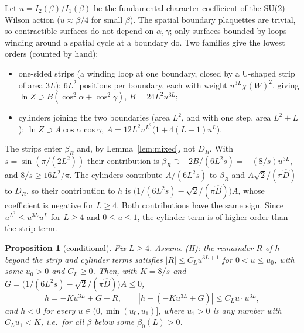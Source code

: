 \documentclass[11pt,a4paper]{article}
\newtheorem{proposition}[theorem]{Proposition}
\theoremstyle{definition}
\theoremstyle{remark}
\newcommand{\bR}{\beta_R}
\newcommand{\DR}{D_R}
\begin{document}
Let $u=I_2(\beta)/I_1(\beta)$ be the fundamental character coefficient of the SU(2) Wilson action ($u\approx\beta/4$ for small $\beta$). The spatial boundary plaquettes are trivial, so contractible surfaces do not depend on $\alpha,\gamma$; only surfaces bounded by loops winding around a spatial cycle at a boundary do. Two families give the lowest orders (counted by hand):
\begin{itemize}[leftmargin=2em]
\item one-sided strips (a winding loop at one boundary, closed by a U-shaped strip of area $3L$): $6L^2$ positions per boundary, each with weight $u^{3L}\chi(W)^2$, giving $\ln Z\supset B(\cos^2\alpha+\cos^2\gamma)$, $B=24L^2u^{3L}$;
\item cylinders joining the two boundaries (area $L^2$, and with one step, area $L^2+L$): $\ln Z\supset A\cos\alpha\cos\gamma$, $A=12L^2u^{L^2}\bigl(1+4(L-1)u^L\bigr)$.
\end{itemize}
The strips enter $\bR$ and, by Lemma~\ref{lem:mixed}, not $\DR$. With $s=\sin(\pi/(2L^2))$ their contribution is $\bR\supset-2B/(6L^2s)=-(8/s)u^{3L}$, and $8/s\ge16L^2/\pi$. The cylinders contribute $A/(6L^2s)$ to $\bR$ and $A\sqrt2/(\pi\hat D)$ to $\DR$, so their contribution to $h$ is $\bigl(1/(6L^2s)-\sqrt2/(\pi\hat D)\bigr)A$, whose coefficient is negative for $L\ge4$. Both contributions have the same sign. Since $u^{L^2}\le u^{3L}u^L$ for $L\ge4$ and $0\le u\le1$, the cylinder term is of higher order than the strip term.

\begin{proposition}[conditional]\label{prop:strong}
Fix $L\ge4$. Assume (H): the remainder $R$ of $h$ beyond the strip and cylinder terms satisfies $|R|\le C_Lu^{3L+1}$ for $0<u\le u_0$, with some $u_0>0$ and $C_L\ge0$. Then, with $K=8/s$ and $G=\bigl(1/(6L^2s)-\sqrt2/(\pi\hat D)\bigr)A\le0$,
\[
h=-K u^{3L}+G+R,\qquad |h-(-Ku^{3L}+G)|\le C_Lu\cdot u^{3L},
\]
and $h<0$ for every $u\in(0,\min(u_0,u_1)]$, where $u_1>0$ is any number with $C_Lu_1<K$, i.e.\ for all $\beta$ below some $\beta_0(L)>0$.
\end{proposition}
\end{document}

